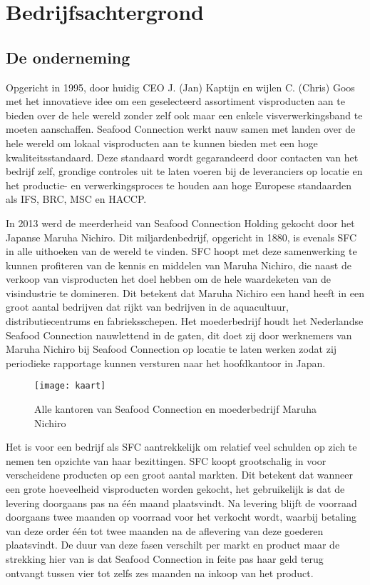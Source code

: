 \chapter{Bedrijfsachtergrond}
\section{De onderneming}
Opgericht in 1995, door huidig CEO J. (Jan) Kaptijn en wijlen C. (Chris) Goos met het innovatieve idee om een geselecteerd assortiment visproducten aan te bieden over de hele wereld zonder zelf ook maar een enkele visverwerkingsband te moeten aanschaffen. Seafood Connection werkt nauw samen met landen over de hele wereld om lokaal visproducten aan te kunnen bieden met een hoge kwaliteitsstandaard. Deze standaard wordt gegarandeerd door contacten van het bedrijf zelf, grondige controles uit te laten voeren bij de leveranciers op locatie en het productie- en verwerkingsproces te houden aan hoge Europese standaarden als IFS, BRC, MSC en HACCP. \citep{sfcreglement}

In 2013 werd de meerderheid van Seafood Connection Holding gekocht door het Japanse Maruha Nichiro. Dit miljardenbedrijf, opgericht in 1880, is evenals SFC in alle uithoeken van de wereld te vinden. SFC hoopt met deze samenwerking te kunnen profiteren van de kennis en middelen van Maruha Nichiro, die naast de verkoop van visproducten het doel hebben om de hele waardeketen van de visindustrie te domineren. Dit betekent dat Maruha Nichiro een hand heeft in een groot aantal bedrijven dat rijkt van bedrijven in de aquacultuur, distributiecentrums en fabrieksschepen. Het moederbedrijf houdt het Nederlandse Seafood Connection nauwlettend in de gaten, dit doet zij door werknemers van Maruha Nichiro bij Seafood Connection op locatie te laten werken zodat zij periodieke rapportage kunnen versturen naar het hoofdkantoor in Japan. \citep{sfcwebsite,Visserijnieuws}

\begin{figure}[!hb]
    \centering
    \texttt{[image: kaart]}
    \caption{Alle kantoren van Seafood Connection en moederbedrijf Maruha Nichiro \citep{sfcwebsite}}
    \label{fig:kantorensfc}
\end{figure}

\label{beschr:activiteiten}
Het is voor een bedrijf als SFC aantrekkelijk om relatief veel schulden op zich te nemen ten opzichte van haar bezittingen. SFC koopt grootschalig in voor verscheidene producten op een groot aantal markten. Dit betekent dat wanneer een grote hoeveelheid visproducten worden gekocht, het gebruikelijk is dat de levering doorgaans pas na één maand plaatsvindt. Na levering blijft de voorraad doorgaans twee maanden op voorraad voor het verkocht wordt, waarbij betaling van deze order één tot twee maanden na de aflevering van deze goederen plaatsvindt. De duur van deze fasen verschilt per markt en product maar de strekking hier van is dat Seafood Connection in feite pas haar geld terug ontvangt tussen vier tot zelfs zes maanden na inkoop van het product. \citep{quickscan}

